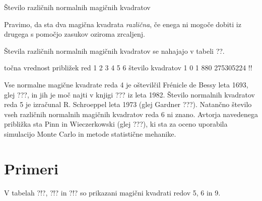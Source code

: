 \documentclass[a4paper,12pt]{article}
\begin{document}
Število različnih normalnih magičnih kvadratov

      Pravimo, da sta dva magična kvadrata \emph{različna}, če enega ni mogoče dobiti
      iz drugega s pomočjo zasukov oziroma zrcaljenj.

Števila različnih normalnih magičnih kvadratov se nahajajo v tabeli ??.

      točna vrednost približek
      red 1 2 3 4 5 6
      število kvadratov 1 0 1 880 275305224 !!

Vse normalne magične kvadrate reda 4 je oštevilčil Frénicle de Bessy
leta 1693, glej ???, in jih je moč najti v knjigi ???
iz leta 1982. Število normalnih kvadratov reda 5 je izračunal
R. Schroeppel leta 1973 (glej Gardner ???).
Natančno število vseh različnih normalnih magičnih kvadratov reda 6 ni znano.
Avtorja navedenega približka sta Pinn in Wieczerkowski (glej ???), ki
sta za oceno uporabila simulacijo Monte Carlo in metode statistične mehanike.


\section{Primeri}

V tabelah ?!?, ?!? in ?!? so prikazani
magični kvadrati redov 5, 6 in 9.


\end{document}

